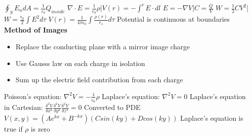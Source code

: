 \documentclass[1pt]{report}
\begin{document}
\begin{multicols}{3}
\begin{flushleft}
$\oint_S {E_n dA = \frac{1}{{\varepsilon _0 }}} Q_{inside}$
\linebreak
$\nabla\cdot E=\frac{1}{\epsilon_0}\rho$|$V(r)=-\int^rE\cdot dl$
\linebreak
$E=-\nabla V$|$C=\frac{Q}{V}$
\linebreak
$W=\frac{1}{2}CV^2$|$W=\frac{\epsilon_0}{2}\int E^2d\tau$
\linebreak
$V(r)=\frac{1}{4\pi\epsilon_0}\int\frac{\rho(r)}{r_s}d\tau$
\linebreak
Potential is continuous at boundaries 
\textbf{Method of Images}
\begin{itemize}[noitemsep]
\item Replace the conducting plane with a mirror image charge
\item Use Gausss law on each charge in isolation
\item Sum up the electric field contribution from each charge
\end{itemize}
Poisson's equation:
$\nabla^2V=-\frac{1}{\epsilon_0}\rho$
\linebreak
Laplace's equation:
$\nabla^2V=0$
\linebreak
Laplace's equation in Cartesian:
$\frac{\delta^2V}{\delta x^2}\frac{\delta^2V}{\delta y^2}\frac{\delta^2V}{\delta z^2}=0$
\linebreak
Converted to PDE
\linebreak
$V(x,y)=(Ae^{kx}+B^{-kx})(Csin(ky)+Dcos(ky))$
Laplace's equation is true if $\rho$ is zero
\linebreak
\begin{comment}
\textbf{First Uniqueness Theorem:}
The solution to Laplace equation in some volume \textit{V} is uniquely determined if V is specified on the boundary surface \textit{S}
\textbf{Corollary:}
The potential in a volume \textit{V} is uniquely determined if (a) the charge density throughout the egion, and (b) the value of V on all boundaries, are specified. 
\textbf{Second Uniqueness Theorem:}
In a volume \textit{V} surrounded by a conductors and containing a specified charge density \textit{$\rho$}, the electric field is uniquely determined if the \textit{total charge} on each conductor is given. (The region as a whole can be bounded by another conductor or else unbounded)
\textbf{Fourier s Trick}
$V_0(y) = \sum_{n=1}^{\infty} C_n \sin \left(\frac{n \pi y}{a} \right)$
\linebreak
$V_0(y) \sin \left(\frac{n' \pi y}{a} \right) =\sum_{n=1}^{\infty} C_n \sin \left(\frac{n \pi y}{a} \right)\sin \left(\frac{n' \pi y}{a} \right)$

\end{comment}
\end{flushleft}
\end{multicols}
\end{document}
